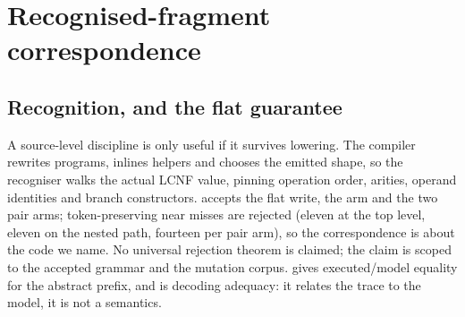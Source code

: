 \documentclass[a4paper,UKenglish,cleveref]{lipics-v2021}
\begin{document}
\section{Recognised-fragment correspondence}\label{sec:correspondence}

\subsection{Recognition, and the flat guarantee}
A source-level discipline is only useful if it survives lowering. The compiler
rewrites programs, inlines helpers and chooses the emitted shape, so the
recogniser walks the actual LCNF value, pinning operation order, arities, operand
identities and branch constructors.  accepts the flat write,
 the  arm and  the two pair
arms; token-preserving near misses are rejected (eleven at the top level, eleven
on the nested path, fourteen per pair arm), so the correspondence is about the
code we name. No universal rejection theorem is claimed; the claim is scoped to
the accepted grammar and the mutation corpus.  gives
executed/model equality for the abstract prefix, and  is
decoding adequacy: it relates the trace to the model, it is not a semantics.
\end{document}
